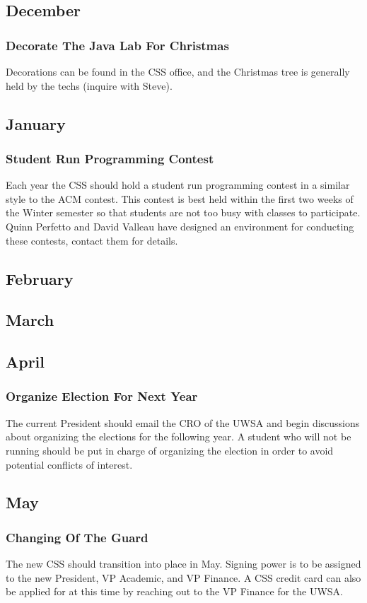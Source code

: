 \documentclass[12pt]{article}
\begin{document}
\subsection{December}

\subsubsection{Decorate The Java Lab For Christmas}
Decorations can be found in the CSS office, and the Christmas tree is generally
held by the techs (inquire with Steve).

\subsection{January}

\subsubsection{Student Run Programming Contest}
Each year the CSS should hold a student run programming contest in a similar
style to the ACM contest.  This contest is best held within the first two weeks
of the Winter semester so that students are not too busy with classes to
participate.  Quinn Perfetto and David Valleau have designed an environment for
conducting these contests, contact them for details.


\subsection{February}
\subsection{March}
\subsection{April}

\subsubsection{Organize Election For Next Year}
The current President should email the CRO of the UWSA and begin discussions
about organizing the elections for the following year.  A student who will not
be running should be put in charge of organizing the election in order to avoid
potential conflicts of interest.

\subsection{May}

\subsubsection{Changing Of The Guard}
The new CSS should transition into place in May.  Signing power is to be assigned
to the new President, VP Academic, and VP Finance.  A CSS credit card can also
be applied for at this time by reaching out to the VP Finance for the UWSA.
\end{document}
